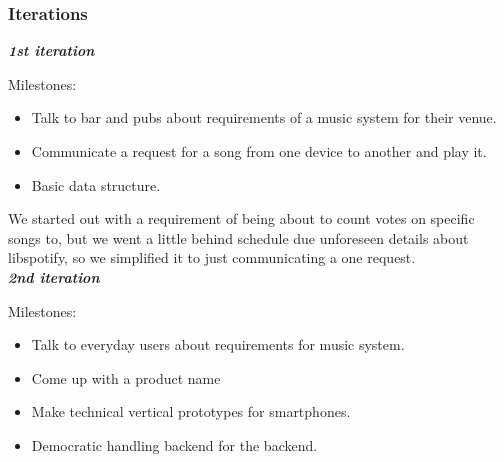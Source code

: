 \subsubsection{Iterations}
\textit{\textbf{1st iteration}}

Milestones:
	\begin{itemize}
		\item Talk to bar and pubs about requirements of a music system for their venue.
		\item Communicate a request for a song from one device to another and play it.
		\item Basic data structure.
	\end{itemize}

We started out with a requirement of being about to count votes on specific songs to, but we went a little behind schedule due unforeseen details about libspotify, so we simplified it to just communicating a one request.\\

\noindent\textit{\textbf{2nd iteration}}
	
Milestones:
	\begin{itemize}
		\item Talk to everyday users about requirements for music system.
		\item Come up with a product name
		\item Make technical vertical prototypes for smartphones.
		\item Democratic handling backend for the backend.
	\end{itemize}
